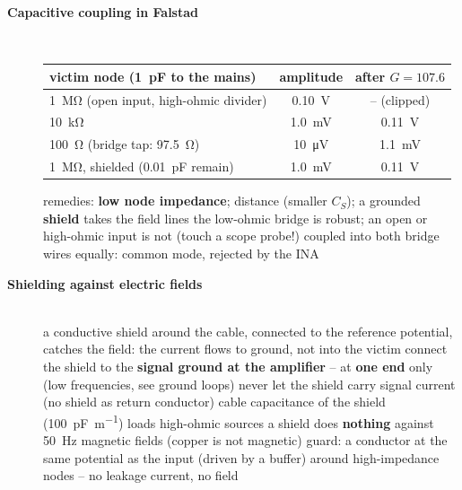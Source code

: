 \begin{description}
\item[{\rot\bf Capacitive coupling in Falstad}]~\\[-\lblskip]
\begin{center}
\begin{tabular}{lcc}
\toprule
victim node (\SI{1}{\pico\farad} to the mains) & amplitude & after $G = 107.6$ \\
\midrule
\SI{1}{\mega\ohm} (open input, high-ohmic divider) & \SI{0.10}{\volt} & -- (clipped) \\
\SI{10}{\kilo\ohm} & \SI{1.0}{\milli\volt} & \SI{0.11}{\volt} \\
\SI{100}{\ohm} (bridge tap: \SI{97.5}{\ohm}) & \SI{10}{\micro\volt} & \SI{1.1}{\milli\volt} \\
\SI{1}{\mega\ohm}, shielded (\SI{0.01}{\pico\farad} remain) & \SI{1.0}{\milli\volt} & \SI{0.11}{\volt} \\
\bottomrule
\end{tabular}
\end{center}
\par
\bi
	\ite remedies: \textbf{low node impedance}; distance (smaller $C_S$); a grounded \textbf{shield} takes the field lines
	\ite the low-ohmic bridge is robust; an open or high-ohmic input is not (touch a scope probe!)
	\ite coupled into both bridge wires equally: common mode, rejected by the INA
\ei
\os{\newpage}

\item[{\rot\bf Shielding against electric fields}]~\\[-\lblskip]
\bi
	\ite a conductive shield around the cable, connected to the reference potential, catches the field: the current flows to ground, not into the victim
	\ite connect the shield to the \textbf{signal ground at the amplifier} -- at \textbf{one end} only (low frequencies, see ground loops)
	\ite never let the shield carry signal current (no shield as return conductor)
	\ite cable capacitance of the shield (\SI{100}{\pico\farad\per\metre}) loads high-ohmic sources
	\ite a shield does \textbf{nothing} against \SI{50}{\hertz} magnetic fields (copper is not magnetic)
	\ite guard: a conductor at the same potential as the input (driven by a buffer) around high-impedance nodes -- no leakage current, no field
\ei
\os{\newpage}


\end{description}
